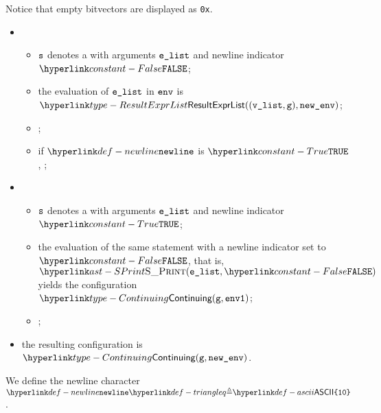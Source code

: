 Notice that empty bitvectors are displayed as \verb|0x|.

\ProseParagraph
\OneApplies
\begin{itemize}
  \item {}
  \begin{itemize}
    \item $\vs$ denotes a \printstatementterm{} with arguments $\elist$ and newline indicator $\False$;
    \item the evaluation of $\elist$ in $\env$ is $\ResultExprList((\vlist, \vg), \newenv)$\ProseOrAbnormal;
    \item {};
    \item if $\vnewline$ is $\True$, ;
  \end{itemize}

  \item {}
  \begin{itemize}
    \item $\vs$ denotes a \printstatementterm{} with arguments $\elist$ and newline indicator $\True$;
    \item the evaluation of the same statement with a newline indicator set to $\False$, that is,
          $\SPrint(\elist, \False)$ yields the configuration \\
          $\Continuing(\vg, \envone)$\ProseOrAbnormal;
    \item {};
  \end{itemize}
  \item the resulting configuration is $\Continuing(\vg, \newenv)$.
\end{itemize}

\FormallyParagraph
\begin{mathpar}
\end{mathpar}

\hypertarget{def-newline}{}
We define the newline character $\vnewline \triangleq \ascii{10}$.

